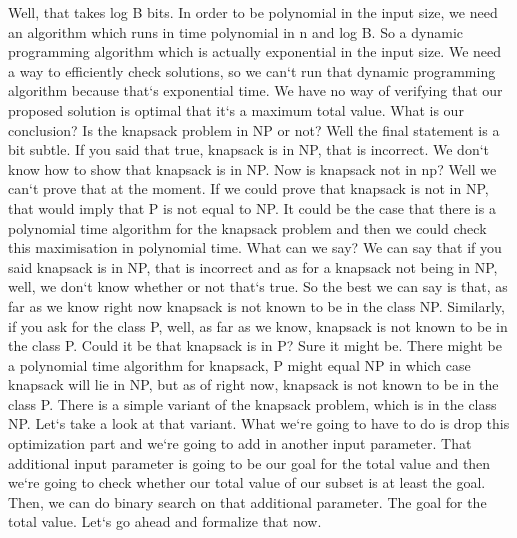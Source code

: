 Well, that takes log B bits.
In order to be polynomial in the input size, we need an algorithm which runs in time polynomial in n and log B\@.
So a dynamic programming algorithm which is actually exponential in the input size.
We need a way to efficiently check solutions, so we can`t run that dynamic programming algorithm because that`s exponential time.
We have no way of verifying that our proposed solution is optimal that it`s a maximum total value.
What is our conclusion? Is the knapsack problem in NP or not? Well the final statement is a bit subtle.
If you said that true, knapsack is in NP, that is incorrect.
We don`t know how to show that knapsack is in NP\@.
Now is knapsack not in np? Well we can`t prove that at the moment.
If we could prove that knapsack is not in NP, that would imply that P is not equal to NP\@.
It could be the case that there is a polynomial time algorithm for the knapsack problem and then we could check this maximisation in polynomial time.
What can we say? We can say that if you said knapsack is in NP, that is incorrect and as for a knapsack not being in NP, well, we don`t know whether or not that`s true.
So the best we can say is that, as far as we know right now knapsack is not known to be in the class NP\@.
Similarly, if you ask for the class P, well, as far as we know, knapsack is not known to be in the class P\@.
Could it be that knapsack is in P? Sure it might be.
There might be a polynomial time algorithm for knapsack, P might equal NP in which case knapsack will lie in NP, but as of right now, knapsack is not known to be in the class P\@.
There is a simple variant of the knapsack problem, which is in the class NP\@.
Let`s take a look at that variant.
What we`re going to have to do is drop this optimization part and we`re going to add in another input parameter.
That additional input parameter is going to be our goal for the total value and then we`re going to check whether our total value of our subset is at least the goal.
Then, we can do binary search on that additional parameter.
The goal for the total value.
Let`s go ahead and formalize that now.

